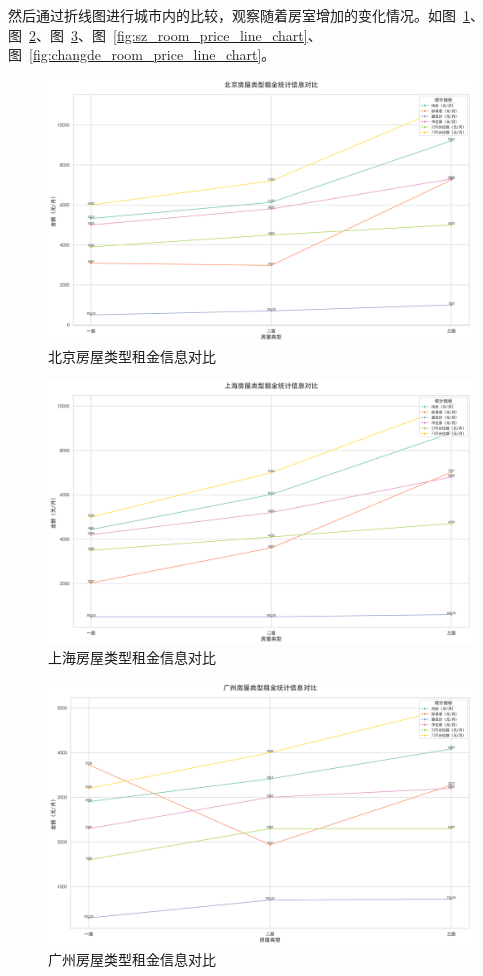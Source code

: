 然后通过折线图进行城市内的比较，观察随着房室增加的变化情况。如图~\ref{fig:bj_room_price_line_chart}、图~\ref{fig:sh_room_price_line_chart}、图~\ref{fig:gz_room_price_line_chart}、图~\ref{fig:sz_room_price_line_chart}、图~\ref{fig:changde_room_price_line_chart}。
\begin{figure}[htbp]
    \centering
    \includegraphics[width=0.7\linewidth]{../../figure/bj_room_price_line_chart.png}
    \caption{北京房屋类型租金信息对比}
    \label{fig:bj_room_price_line_chart}
\end{figure}
\begin{figure}[htbp]
    \centering
    \includegraphics[width=0.7\linewidth]{../../figure/sh_room_price_line_chart.png}
    \caption{上海房屋类型租金信息对比}
    \label{fig:sh_room_price_line_chart}
\end{figure}
\begin{figure}[htbp]
    \centering
    \includegraphics[width=0.7\linewidth]{../../figure/gz_room_price_line_chart.png}
    \caption{广州房屋类型租金信息对比}
    \label{fig:gz_room_price_line_chart}
\end{figure}

